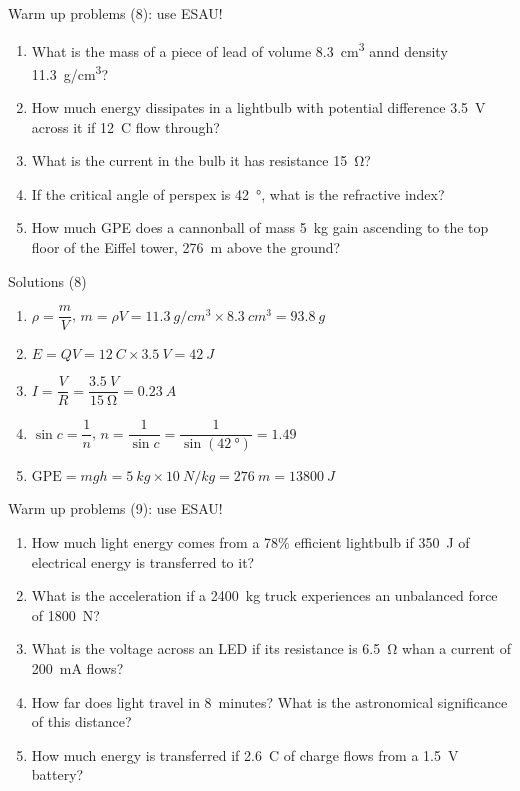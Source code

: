 \documentclass[14pt]{beamer}
\begin{document}
\begin{frame}{Warm up problems (8): use ESAU!}
\vspace*{-0.8em}\begin{enumerate}
\item\label{4.2} What is the mass of a piece of lead of volume \SI{8.3}{cm^3} annd density \SI{11.3}{g/cm^3}?
\item\label{13.1} How much energy dissipates in a lightbulb with potential difference \SI{3.5}{V} across it if \SI{12}{C} flow through?
\item\label{11.2} What is the current in the bulb it has resistance \SI{15}{\ohm}?
\item\label{16.3} If the critical angle of perspex is \SI{42}{\degree}, what is the refractive index?
\item\label{7.1} How much GPE does a cannonball of mass \SI{5}{kg} gain ascending to the top floor of the Eiffel tower, \SI{276}{m} above the ground?
\end{enumerate}
\end{frame}

\begin{frame}{Solutions (8)}
\vspace*{-0.8em}\begin{enumerate}
\item\label{4.2} $\rho = \dfrac{m}{V}$, $m=\rho V=\SI{11.3}{g/cm^3}\times\SI{8.3}{cm^3}=\SI{93.8}{g}$
\item\label{13.1} $E=QV=\SI{12}{C}\times\SI{3.5}{V}=\SI{42}{J}$
\item\label{11.2} $I=\dfrac{V}{R}=\dfrac{\SI{3.5}{V}}{\SI{15}{\ohm}}=\SI{0.23}{A}$
\item\label{16.3} $\sin c = \dfrac{1}{n}$, $n=\dfrac{1}{\sin c}=\dfrac{1}{\sin(\SI{42}{\degree})}=1.49$
\item\label{7.1} $\text{GPE}=mgh=\SI{5}{kg}\times\SI{10}{N/kg}=\SI{276}{m}=\SI{13800}{J}$
\end{enumerate}
\end{frame}

\begin{frame}{Warm up problems (9): use ESAU!}
\vspace*{-0.8em}\begin{enumerate}
\item\label{17.2} How much light energy comes from a 78\% efficient lightbulb if \SI{350}{J} of electrical energy is transferred to it?
\item\label{2.3} What is the acceleration if a \SI{2400}{kg} truck experiences an unbalanced force of \SI{1800}{N}?
\item\label{11.1} What is the voltage across an LED if its resistance is \SI{6.5}{\ohm} whan a current of \SI{200}{mA} flows?
\item\label{1.2} How far does light travel in \SI{8}{minutes}?  What is the astronomical significance of this distance?
\item\label{13.1} How much energy is transferred if \SI{2.6}{C} of charge flows from a \SI{1.5}{V} battery?
\end{enumerate}
\end{frame}
\end{document}
